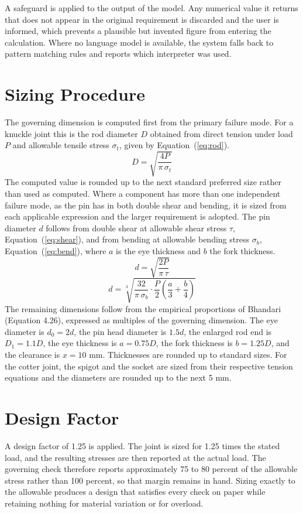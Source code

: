 A safeguard is applied to the output of the model. Any numerical value it returns that does not appear in the original requirement is discarded and the user is informed, which prevents a plausible but invented figure from entering the calculation. Where no language model is available, the system falls back to pattern matching rules and reports which interpreter was used.

\section{Sizing Procedure}
The governing dimension is computed first from the primary failure mode. For a knuckle joint this is the rod diameter $D$ obtained from direct tension under load $P$ and allowable tensile stress $\sigma_t$, given by Equation~(\ref{eq:rod}).
\begin{equation}
D = \sqrt{\frac{4P}{\pi\,\sigma_t}}
\label{eq:rod}
\end{equation}
The computed value is rounded up to the next standard preferred size rather than used as computed. Where a component has more than one independent failure mode, as the pin has in both double shear and bending, it is sized from each applicable expression and the larger requirement is adopted. The pin diameter $d$ follows from double shear at allowable shear stress $\tau$, Equation~(\ref{eq:shear}), and from bending at allowable bending stress $\sigma_b$, Equation~(\ref{eq:bend}), where $a$ is the eye thickness and $b$ the fork thickness.
\begin{equation}
d = \sqrt{\frac{2P}{\pi\,\tau}}
\label{eq:shear}
\end{equation}
\begin{equation}
d = \sqrt[3]{\frac{32}{\pi\,\sigma_b}\cdot\frac{P}{2}\left(\frac{a}{3}+\frac{b}{4}\right)}
\label{eq:bend}
\end{equation}
The remaining dimensions follow from the empirical proportions of Bhandari (Equation 4.26), expressed as multiples of the governing dimension. The eye diameter is $d_0 = 2d$, the pin head diameter is $1.5d$, the enlarged rod end is $D_1 = 1.1D$, the eye thickness is $a = 0.75D$, the fork thickness is $b = 1.25D$, and the clearance is $x = 10$ mm. Thicknesses are rounded up to standard sizes. For the cotter joint, the spigot and the socket are sized from their respective tension equations and the diameters are rounded up to the next 5 mm.

\section{Design Factor}
A design factor of 1.25 is applied. The joint is sized for 1.25 times the stated load, and the resulting stresses are then reported at the actual load. The governing check therefore reports approximately 75 to 80 percent of the allowable stress rather than 100 percent, so that margin remains in hand. Sizing exactly to the allowable produces a design that satisfies every check on paper while retaining nothing for material variation or for overload.

